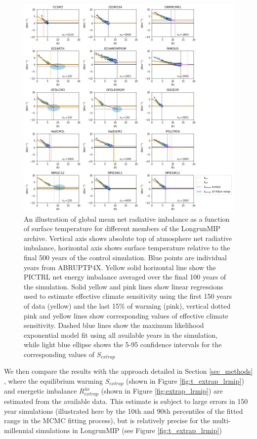\documentclass[esd, article]{copernicus}
\begin{document}
\begin{figure}
    \centering
    \includegraphics[width=\linewidth]{greg_lrmip.png}
    \caption{An illustration of global mean net radiative imbalance as a function of surface temperature for different members of the LongrunMIP archive.  Vertical axis shows absolute top of atmosphere net radiative imbalance, horizontal axis shows surface temperature relative to the final 500 years of the control simulation.  Blue points are individual years from ABRUPTP4X.  Yellow solid horizontal line show the PICTRL net energy imbalance averaged over the final 100 years of the simulation.   Solid yellow and pink lines show linear regressions used to estimate effective climate sensitivity using the first 150 years of data (yellow) and the last 15$\%$ of warming (pink), vertical dotted pink and yellow lines show corresponding values of effective climate sensitivity.  Dashed blue lines show the maximum likelihood exponential model fit using all available years in the simulation, while light blue ellipse shows the 5-95 confidence intervals for the corresponding values of $S_{extrap}$
     }
    \label{fig:greg_lrmip}
\end{figure}

We then compare the results with the approach detailed in Section \ref{sec_methods} , where the equilibrium warming $S_{extrap}$ (shown in Figure \ref{fig:t_extrap_lrmip}) and energetic imbalance $R^{4x}_{extrap}$ (shown in Figure \ref{fig:extrap_lrmip}) are estimated from the available data.  This estimate is subject to large errors in 150 year simulations (illustrated here by the 10th and 90th percentiles of the fitted range in the MCMC fitting process), but is relatively precise for the multi-millennial simulations in LongrunMIP (see Figure \ref{fig:t_extrap_lrmip})
\end{document}
